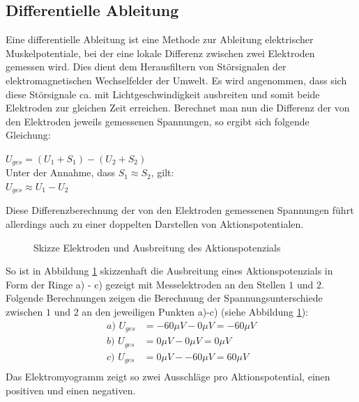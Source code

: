\documentclass[11pt]{article}
\begin{document}
\subsection{Differentielle Ableitung}\label{differentiell}
Eine differentielle Ableitung ist eine Methode zur Ableitung elektrischer Muskelpotentiale, bei der eine lokale Differenz zwischen zwei Elektroden gemessen wird. Dies dient dem Herausfiltern von Störsignalen der elektromagnetischen Wechselfelder der Umwelt. Es wird angenommen, dass sich diese Störsignale ca. mit Lichtgeschwindigkeit ausbreiten und somit beide Elektroden zur gleichen Zeit erreichen. Berechnet man nun die Differenz der von den Elektroden jeweils gemessenen Spannungen, so ergibt sich folgende Gleichung:
\begin{center}
$U_{ges}= (U_1+S_1) - (U_2 + S_2)$ \\

Unter der Annahme, dass $S_1 \approx S_2$, gilt: \\

$U_{ges} \approx U_1 - U_2$
\end{center}

Diese Differenzberechnung der von den Elektroden gemessenen Spannungen führt allerdings auch zu einer doppelten Darstellen von Aktionspotentialen.
\begin{figure}[H]
\caption{Skizze Elektroden und Ausbreitung des Aktionspotenzials}
\label{diff}
\end{figure}
So ist in Abbildung \ref{diff} skizzenhaft die Ausbreitung eines Aktionspotenzials in Form der Ringe a) - c) gezeigt mit Messelektroden an den Stellen $1$ und $2$. Folgende Berechnungen zeigen die Berechnung der Spannungsunterschiede zwischen $1$ und $2$ an den jeweiligen Punkten a)-c) (siehe Abbildung \ref{diff}):
\begin{align*}
a)\,\, U_{ges} &= -60\mu V - 0\mu V =  -60\mu V\\
b)\,\, U_{ges} &= 0\mu V - 0\mu V =  0\mu V\\
c)\,\, U_{ges} &= 0\mu V - -60\mu V =  60\mu V\\
\end{align*}
Das Elektromyogramm zeigt so zwei Ausschläge pro Aktionspotential, einen positiven und einen negativen. 
\end{document}
